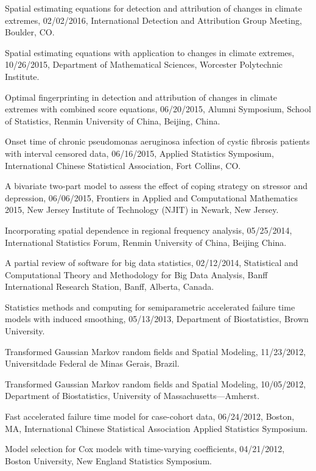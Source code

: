 \documentclass[Statistics]{vita}
\begin{document}
\begin{vita}
\begin{InvitedTalks}
  \item Spatial estimating equations for detection and attribution of changes in climate extremes, 02/02/2016, International Detection and Attribution Group Meeting, Boulder, CO\@.
  \item Spatial estimating equations with application to changes in climate extremes, 10/26/2015, Department of Mathematical Sciences, Worcester Polytechnic Institute.
  \item Optimal fingerprinting in detection and attribution of changes in climate extremes with combined score equations, 06/20/2015, Alumni Symposium, School of Statistics, Renmin University of China, Beijing, China.
  \item Onset time of chronic pseudomonas aeruginosa infection of cystic fibrosis patients with interval censored data, 06/16/2015, Applied Statistics Symposium, International Chinese Statistical Association, Fort Collins, CO\@.
  \item A bivariate two-part model to assess the effect of coping strategy on stressor and depression, 06/06/2015, Frontiers in Applied and Computational Mathematics 2015, New Jersey Institute of Technology (NJIT) in Newark, New Jersey.
  \item Incorporating spatial dependence in regional frequency analysis, 05/25/2014, International Statistics Forum, Renmin University of China, Beijing China.
  \item A partial review of software for big data statistics, 02/12/2014, Statistical and Computational Theory and Methodology for Big Data Analysis, Banff International Research Station, Banff, Alberta, Canada.
  \item Statistics methods and computing for semiparametric accelerated failure time models with induced smoothing, 05/13/2013, Department of Biostatistics, Brown University.
  \item Transformed Gaussian Markov random fields and Spatial Modeling, 11/23/2012, Universitdade Federal de Minas Gerais, Brazil.
  \item Transformed Gaussian Markov random fields and Spatial Modeling, 10/05/2012, Department of Biostatistics, University of Massachusetts---Amherst.
  \item Fast accelerated failure time model for case-cohort data, 06/24/2012, Boston, MA, International Chinese Statistical Association Applied Statistics Symposium.
  \item Model selection for Cox models with time-varying coefficients, 04/21/2012, Boston University, New England Statistics Symposium.

\end{InvitedTalks}
\end{vita}
\end{document}
